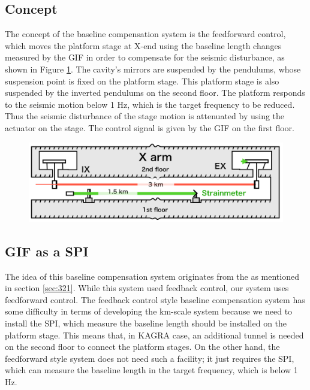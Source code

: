 \subsection{Concept}
The concept of the baseline compensation system is the feedforward control, which moves the platform stage at X-end using the baseline length changes measured by the GIF in order to compensate for the seismic disturbance, as shown in Figure \ref{img:img512}. The cavity's mirrors are suspended by the pendulums, whose suspension point is fixed on the platform stage. This platform stage is also suspended by the inverted pendulums on the second floor. The platform responds to the seismic motion below 1 Hz, which is the target frequency to be reduced. Thus the seismic disturbance of the stage motion is attenuated by using the actuator on the stage. The control signal is given by the GIF on the first floor.
\begin{figure}[h]
  \begin{center}   
    \includegraphics[width=14cm]{./img_chap5/img512.png}
    \caption{} \label{img:img512}
  \end{center}
\end{figure}

\subsection{GIF as a SPI}
The idea of this baseline compensation system originates from the \cite{Numata2008interferometric} as mentioned in section \ref{sec:321}. While this system used feedback control, our system uses feedforward control. The feedback control style baseline compensation system has some difficulty in terms of developing the km-scale system because we need to install the SPI, which measure the baseline length should be installed on the platform stage. This means that, in KAGRA case, an additional tunnel is needed on the second floor to connect the platform stages. On the other hand, the feedforward style system does not need such a facility; it just requires the SPI, which can measure the baseline length in the target frequency, which is below 1 Hz.

